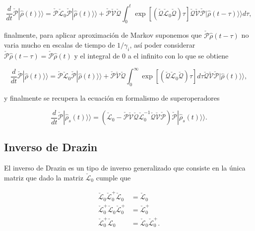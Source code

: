 \begin{appendixs}
\begin{equation*}
    \frac{d}{dt}\check{\mathcal{P}}|\hat{\rho}(t)\rangle \rangle = \check{\mathcal{P}}\check{\mathcal{L}}_{0}\check{\mathcal{P}}|\hat{\rho}(t)\rangle \rangle + \check{\mathcal{P}}\check{\mathcal{V}}\check{\mathcal{Q}}\int_{0}^{t}\exp \left[\left( \check{\mathcal{Q}}\check{\mathcal{L}}_{0}\check{\mathcal{Q}}\right)\tau \right]\check{\mathcal{Q}}\check{\mathcal{V}} \check{\mathcal{P}}|\hat{\rho}(t-\tau)\rangle \rangle d\tau,        
\end{equation*}

finalmente, para aplicar aproximación de Markov suponemos que $\check{\mathcal{P}}\hat{\rho}(t-\tau)$ no varia mucho en escalas de tiempo de $1/\gamma_{i}$, así poder considerar $\check{\mathcal{P}}\hat{\rho}(t-\tau) = \check{\mathcal{P}}\hat{\rho}(t)$ y el integral de $0$ a el infinito con lo que se obtiene

\begin{equation*}
    \frac{d}{dt}\check{\mathcal{P}}|\hat{\rho}(t)\rangle \rangle = \check{\mathcal{P}}\check{\mathcal{L}}_{0}\check{\mathcal{P}}|\hat{\rho}(t)\rangle \rangle + \check{\mathcal{P}}\check{\mathcal{V}}\check{\mathcal{Q}}\int_{0}^{\infty}\exp \left[\left( \check{\mathcal{Q}}\check{\mathcal{L}}_{0}\check{\mathcal{Q}}\right)\tau \right]d\tau \check{\mathcal{Q}}\check{\mathcal{V}} \check{\mathcal{P}}|\hat{\rho}(t)\rangle \rangle ,        
\end{equation*}

y finalmente se recupera la ecuación en formalismo de superoperadores  

\begin{equation*}
    \frac{d}{dt}\check{\mathcal{P}}|\hat{\rho}_{s}(t)\rangle \rangle = (\check{\mathcal{L}}_{0} - \check{\mathcal{P}}\check{\mathcal{V}}\check{\mathcal{Q}}\check{\mathcal{L}}^{-1}_{0}\check{\mathcal{Q}}\check{\mathcal{V}}\check{\mathcal{P}})\check{\mathcal{P}}|\hat{\rho}_{s}(t)\rangle \rangle. 
\end{equation*}



\label{appendix5clasic}

\subsection{ Inverso de Drazin }
El inverso de Drazin es un tipo de inverso generalizado que consiste en la única matriz que  dado la matriz $\check{\mathcal{L}}_{0}$ cumple que 

\begin{align*}
    \check{\mathcal{L}}_{0}\check{\mathcal{L}}_{0}^{+}\check{\mathcal{L}}_{0} & = \check{\mathcal{L}}_{0} \\
    \check{\mathcal{L}}_{0}^{+}\check{\mathcal{L}}_{0}\check{\mathcal{L}}_{0}^{+} & = \check{\mathcal{L}}_{0}^{+} \\
    \check{\mathcal{L}}_{0}^{+}\check{\mathcal{L}}_{0} & = \check{\mathcal{L}}_{0}\check{\mathcal{L}}_{0}^{+}.
\end{align*}


\end{appendixs}
